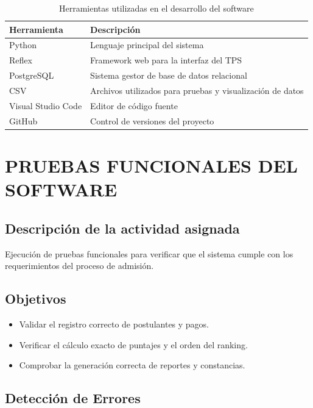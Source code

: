 \documentclass[12pt, a4paper]{report}
\begin{document}
\begin{table}[H]
\centering
\caption{Herramientas utilizadas en el desarrollo del software}
\label{tab:herramientas}
\begin{tabular}{p{5cm} p{7cm}}
\toprule
\textbf{Herramienta} & \textbf{Descripción} \\
\midrule
Python & Lenguaje principal del sistema \\
Reflex & Framework web para la interfaz del TPS \\
PostgreSQL & Sistema gestor de base de datos relacional \\
CSV & Archivos utilizados para pruebas y visualización de datos \\
Visual Studio Code & Editor de código fuente \\
GitHub & Control de versiones del proyecto \\
\bottomrule
\end{tabular}
\end{table}

\section{PRUEBAS FUNCIONALES DEL SOFTWARE}

\subsection{Descripción de la actividad asignada}

Ejecución de pruebas funcionales para verificar que el sistema cumple con los requerimientos del proceso de admisión.

\subsection{Objetivos}

\begin{itemize}[noitemsep]
  \item Validar el registro correcto de postulantes y pagos.
  \item Verificar el cálculo exacto de puntajes y el orden del ranking.
  \item Comprobar la generación correcta de reportes y constancias.
\end{itemize}

\subsection{Detección de Errores}
\end{document}
